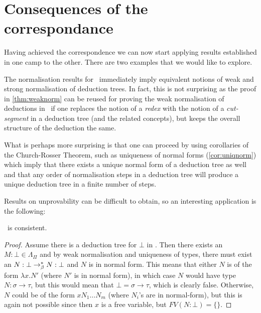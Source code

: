 \section{Consequences of the correspondance}

Having achieved the correspondence we can now start applying results
established in one camp to the other. There are two examples that we would like
to explore.

The normalisation results for \stlambda\ immediately imply equivalent notions
of weak and strong normalisation of deduction trees. In fact, this is not
surprising as the proof in \ref{thm:weaknorm} can be reused for proving the
weak normalisation of deductions in \implnpi\ if one replaces the notion of a
\emph{redex} with the notion of a \emph{cut-segment} in a deduction tree (and the
related concepts), but keeps the overall structure of the deduction the same.

What is perhaps more surprising is that one can proceed by using corollaries of
the Church-Rosser Theorem, such as uniqueness of normal forms
(\ref{cor:uniqnorm}) which imply that there exists a unique normal form of a
deduction tree as well and that any order of normalisation steps in a
deduction tree will produce a unique deduction tree in a finite number of steps.

Results on unprovability can be difficult to obtain, so an interesting
application is the following:

\begin{proposition}\implnpi\ is consistent.\end{proposition}
\begin{proof}
    Assume there is a deduction tree for $\bot$ in \implnpi. Then there exists
    an $M\!:\!\bot \in \Lambda_\Pi$ and by weak normalisation and uniqueness of
    types, there must exist an $N:\bot \rightarrow_\beta^* N:\bot$ and $N$ is in normal
    form. This means that either $N$ is of the form $\lambda x. N'$ (where $N'$
    is in normal form), in which case $N$ would have type $N:\sigma\to\tau$,
    but this would mean that $\bot = \sigma\to\tau$, which is clearly false.
    Otherwise, $N$ could be of the form $x N_1 \ldots N_m$ (where $N_i$'s are
    in normal-form), but this is again not possible since then $x$ is a free
    variable, but $FV(N:\bot) = \{\}$.
\end{proof}
